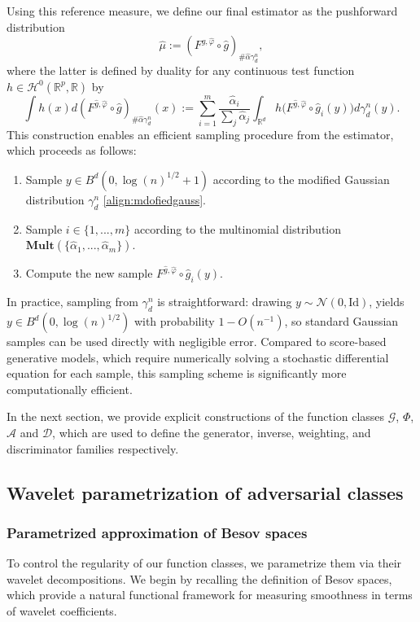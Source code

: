 \documentclass[10pt]{article}
\begin{document}
Using this reference measure, we define our final estimator as the pushforward distribution
\begin{equation}\label{eq:hatmu}
    \hat{\mu}:=(F^{\hat{g},\hat{\varphi}}\circ \hat{g})_{\# \hat{\alpha}\gamma_d^n},
\end{equation}
where the latter is defined by duality for any continuous test function $h\in \mathcal{H}^0(\mathbb{R}^p,\mathbb{R})$ by
\begin{equation}\label{eq:push}
\int h(x)d(F^{\hat{g},\hat{\varphi}}\circ \hat{g})_{\# \hat{\alpha}\gamma_d^n}(x):=\sum \limits_{i=1}^m \frac{\hat{\alpha}_i}{\sum_j \hat{\alpha}_j} \int_{\mathbb{R}^d}h\big(F^{\hat{g},\hat{\varphi}}\circ\hat{g}_i(y)\big)d\gamma_d^n(y).
\end{equation}
This construction enables an efficient sampling procedure from the estimator, which proceeds as follows:
\begin{enumerate}
    \item Sample $y\in B^d(0,\log(n)^{1/2}+1)$ according to the modified Gaussian distribution $\gamma_d^n$ \eqref{align:mdofiedgauss}.
    \item                  Sample $i\in \{1,...,m\}$ according to the multinomial distribution $\textbf{Mult}(\{\hat{\alpha}_1,...,\hat{\alpha}_m\})$.
    \item Compute the new sample $F^{\hat{g},\hat{\varphi}}\circ\hat{g}_i(y)$.
\end{enumerate}
In practice, sampling from $\gamma_d^n$ is straightforward: drawing $y\sim \mathcal{N}(0,\text{Id})$,  yields $y\in B^d(0,\log(n)^{1/2})$ with probability $1-O(n^{-1})$, so standard Gaussian samples can be used directly with negligible error. 
Compared to score-based generative models, which require numerically solving a stochastic differential equation for each sample, this sampling scheme is significantly more computationally efficient.

In the next section, we provide explicit constructions of the function classes \( \mathcal{G} \), \( \Phi \), \( \mathcal{A} \) and \( \mathcal{D} \), which are used to define the generator, inverse, weighting, and discriminator families respectively.

\subsection{Wavelet parametrization of adversarial classes}
\subsubsection{Parametrized approximation of Besov spaces}\label{sec:paramBesov}
To control the regularity of our function classes, we parametrize them via their wavelet decompositions. We begin by recalling the definition of Besov spaces, which provide a natural functional framework for measuring smoothness in terms of wavelet coefficients.
\end{document}
